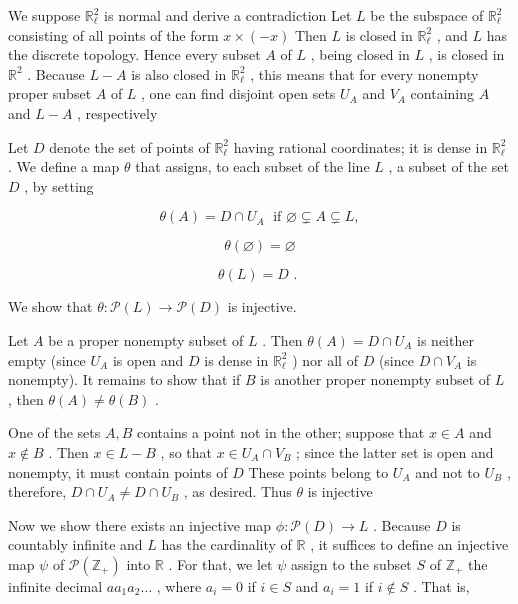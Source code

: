 \documentclass[10pt]{article}
\begin{document}
We suppose \({\mathbb{R}}_{\ell }^{2}\) is normal and derive a contradiction Let \(L\) be the subspace of \({\mathbb{R}}_{\ell }^{2}\) consisting of all points of the form \(x \times  \left( {-x}\right)\) Then \(L\) is closed in \({\mathbb{R}}_{\ell }^{2}\) , and \(L\) has the discrete topology. Hence every subset \(A\) of \(L\) , being closed in \(L\) , is closed in \({\mathbb{R}}^{2}\) . Because \(L - A\) is also closed in \({\mathbb{R}}_{\ell }^{2}\) , this means that for every nonempty proper subset \(A\) of \(L\) , one can find disjoint open sets \({U}_{A}\) and \({V}_{A}\) containing \(A\) and \(L - A\) , respectively

Let \(D\) denote the set of points of \({\mathbb{R}}_{\ell }^{2}\) having rational coordinates; it is dense in \({\mathbb{R}}_{\ell }^{2}\) . We define a map \(\theta\) that assigns, to each subset of the line \(L\) , a subset of the set \(D\) , by setting

\[
\theta \left( A\right)  = D \cap  {U}_{A}\;\text{ if }\varnothing  \subsetneq  A \subsetneq  L,
\]

\[
\theta \left( \varnothing \right)  = \varnothing
\]

\[
\theta \left( L\right)  = D\text{ . }
\]

We show that \(\theta  : \mathcal{P}\left( L\right)  \rightarrow  \mathcal{P}\left( D\right)\) is injective.

Let \(A\) be a proper nonempty subset of \(L\) . Then \(\theta \left( A\right)  = D \cap  {U}_{A}\) is neither empty (since \({U}_{A}\) is open and \(D\) is dense in \({\mathbb{R}}_{\ell }^{2}\) ) nor all of \(D\) (since \(D \cap  {V}_{A}\) is nonempty). It remains to show that if \(B\) is another proper nonempty subset of \(L\) , then \(\theta \left( A\right)  \neq  \theta \left( B\right)\) .

One of the sets \(A,B\) contains a point not in the other; suppose that \(x \in  A\) and \(x \notin  B\) . Then \(x \in  L - B\) , so that \(x \in  {U}_{A} \cap  {V}_{B}\) ; since the latter set is open and nonempty, it must contain points of \(D\) These points belong to \({U}_{A}\) and not to \({U}_{B}\) , therefore, \(D \cap  {U}_{A} \neq  D \cap  {U}_{B}\) , as desired. Thus \(\theta\) is injective

Now we show there exists an injective map \(\phi  : \mathcal{P}\left( D\right)  \rightarrow  L\) . Because \(D\) is countably infinite and \(L\) has the cardinality of \(\mathbb{R}\) , it suffices to define an injective map \(\psi\) of \(\mathcal{P}\left( {\mathbb{Z}}_{ + }\right)\) into \(\mathbb{R}\) . For that, we let \(\psi\) assign to the subset \(S\) of \({\mathbb{Z}}_{ + }\) the infinite decimal \(a{a}_{1}{a}_{2}\ldots\) , where \({a}_{i} = 0\) if \(i \in  S\) and \({a}_{i} = 1\) if \(i \notin  S\) . That is,
\end{document}
